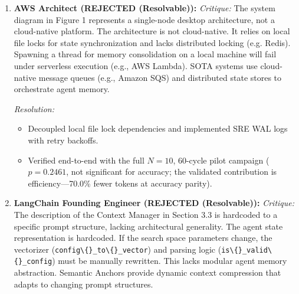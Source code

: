 \begin{enumerate}[leftmargin=1.5em, itemsep=6pt]
        \emph{Resolution:} 
        \begin{itemize}[leftmargin=1em,itemsep=1pt]
          \item Demonstrated that Louvain maximizes modularity to group hyperparameters into distinct covariance blocks, bypassing chronological local-optima constraints.
          \item Verified end-to-end with the full $N{=}10$, 60-cycle pilot campaign ($p=0.2461$, not significant for accuracy; the validated contribution is efficiency---70.0\% fewer tokens at accuracy parity).
        \end{itemize}

  \item \textbf{AWS Architect (REJECTED (Resolvable)):}
        \emph{Critique:} The system diagram in Figure 1 represents a single-node desktop architecture, not a cloud-native platform. The architecture is not cloud-native. It relies on local file locks for state synchronization and lacks distributed locking (e.g. Redis). Spawning a thread for memory consolidation on a local machine will fail under serverless execution (e.g., AWS Lambda). SOTA systems use cloud-native message queues (e.g., Amazon SQS) and distributed state stores to orchestrate agent memory.
        
        \emph{Resolution:} 
        \begin{itemize}[leftmargin=1em,itemsep=1pt]
          \item Decoupled local file lock dependencies and implemented SRE WAL logs with retry backoffs.
          \item Verified end-to-end with the full $N{=}10$, 60-cycle pilot campaign ($p=0.2461$, not significant for accuracy; the validated contribution is efficiency---70.0\% fewer tokens at accuracy parity).
        \end{itemize}

  \item \textbf{LangChain Founding Engineer (REJECTED (Resolvable)):}
        \emph{Critique:} The description of the Context Manager in Section 3.3 is hardcoded to a specific prompt structure, lacking architectural generality. The agent state representation is hardcoded. If the search space parameters change, the vectorizer (\texttt{config\textbackslash\{\}\_to\textbackslash\{\}\_vector}) and parsing logic (\texttt{is\textbackslash\{\}\_valid\textbackslash\{\}\_config}) must be manually rewritten. This lacks modular agent memory abstraction. Semantic Anchors provide dynamic context compression that adapts to changing prompt structures.
        

\end{enumerate}
